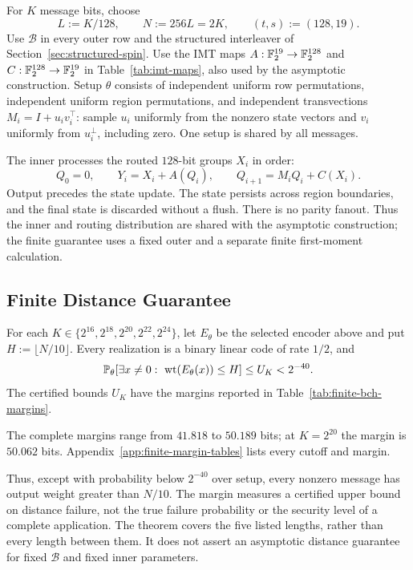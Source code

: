 For $K$ message bits, choose
\[
  L:=K/128,\qquad N:=256L=2K,\qquad (t,s):=(128,19).
\]
Use $\mathcal B$ in every outer row and the structured interleaver of
Section~\ref{sec:structured-spin}. Use the IMT maps
$A:\mathbb F_2^{19}\to\mathbb F_2^{128}$ and $C:\mathbb F_2^{128}\to\mathbb F_2^{19}$ in
Table~\ref{tab:imt-maps}, also used by the asymptotic construction.
Setup $\theta$ consists of
independent uniform row permutations, independent uniform region permutations,
and independent transvections $M_i=I+u_iv_i^\top$: sample $u_i$ uniformly
from the nonzero state vectors and $v_i$ uniformly from $u_i^\perp$,
including zero.
One setup is shared by all messages.

The inner processes the routed $128$-bit groups $X_i$ in order:
\[
  Q_0=0,\qquad Y_i=X_i+A(Q_i),\qquad
  Q_{i+1}=M_iQ_i+C(X_i).
\]
Output precedes the state update. The state persists across region boundaries,
and the final state is discarded without a flush. There is no parity fanout.
Thus the inner and routing distribution are shared with the asymptotic
construction; the finite guarantee uses a fixed outer and a separate
finite first-moment calculation.

\subsection{Finite Distance Guarantee}

\begin{samepage}
\begin{theorem}
\label{thm:finite-bch-spin}
\leavevmode\par
For each $K\in\{2^{16},2^{18},2^{20},2^{22},2^{24}\}$, let $E_\theta$ be
the selected encoder above and put $H:=\lfloor N/10\rfloor$.
Every realization is a binary linear code of rate $1/2$, and
\begin{equation}
  \mathbb P_\theta\!\left[
    \exists x\ne0:\ \operatorname{wt}(E_\theta(x))\le H
  \right]\le U_K<2^{-40}.
  \label{eq:finite-bch-distance}
\end{equation}
The certified bounds $U_K$ have the margins reported in
Table~\ref{tab:finite-bch-margins}.
\end{theorem}
\end{samepage}

The complete margins range from $41.818$ to $50.189$ bits; at $K=2^{20}$
the margin is $50.062$ bits. Appendix~\ref{app:finite-margin-tables}
lists every cutoff and margin.

Thus, except with probability below $2^{-40}$ over setup, every nonzero
message has output weight greater than $N/10$.
The margin measures a certified upper bound on distance failure, not the
true failure probability or the security level of a complete application.
The theorem covers the five listed lengths, rather than every length between
them. It does not assert an asymptotic distance guarantee for fixed
$\mathcal B$ and fixed inner parameters.

